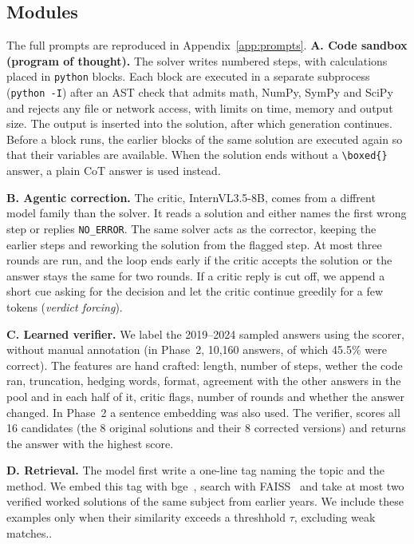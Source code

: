 \documentclass[conference]{IEEEtran}
\begin{document}
\subsection{Modules}
The full prompts are reproduced in Appendix~\ref{app:prompts}.
\textbf{A. Code sandbox (program of thought).} The solver writes numbered steps, with calculations placed in \texttt{python} blocks. Each block are executed in a separate
subprocess (\texttt{python -I}) after an AST check that admits math, NumPy, SymPy and SciPy and
rejects any file or network access, with limits on time, memory and output size. The output is inserted into the solution, after which generation continues. Before a block runs, the earlier
blocks of the same solution are executed again so that their variables are available. When the
solution ends without a \verb|\boxed{}| answer, a plain CoT answer is used instead.

\textbf{B. Agentic correction.} The critic, InternVL3.5-8B, comes from a diffrent model family
than the solver. It reads a solution and either names the first wrong step or replies
\texttt{NO\_ERROR}. The same solver acts as the corrector, keeping the earlier steps and reworking the solution from the flagged step. At most three rounds are run, and the loop ends
early if the critic accepts the solution or the answer stays the same for two rounds. If a critic
reply is cut off, we append a short cue asking for the decision and let the critic continue
greedily for a few tokens (\emph{verdict forcing}).

\textbf{C. Learned verifier.} We label the 2019--2024 sampled answers using the scorer, without manual annotation (in Phase~2, 10{,}160
answers, of which 45.5\% were correct). The features are hand crafted: length, number of steps,
wether the code ran, truncation, hedging words, format, agreement with the other answers in the
pool and in each half of it, critic flags, number of rounds and whether the answer changed. In
Phase~2 a sentence embedding was also used. The verifier, scores all 16 candidates (the 8 original
solutions and their 8 corrected versions) and returns the answer with the highest score.

\textbf{D. Retrieval.} The model first write a one-line tag naming the topic and the method. We
embed this tag with bge~\cite{bge}, search with FAISS~\cite{faiss} and take at most two verified worked solutions of the same subject from earlier
years. We include these examples only when their similarity exceeds a threshhold $\tau$, excluding weak matches..
\end{document}
